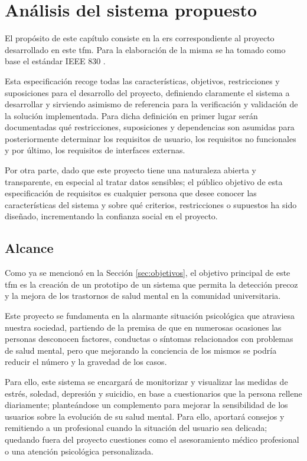 \chapter{Análisis del sistema propuesto}
\label{chapter:analisis}


El propósito de este capítulo consiste en la \gls{ers} correspondiente al proyecto desarrollado en este \gls{tfm}. Para la elaboración de la misma se ha tomado como base el estándar IEEE 830 \cite{noauthor_ieee_1998}.

Esta especificación recoge todas las características, objetivos, restricciones y suposiciones para el desarrollo del proyecto, definiendo claramente el sistema a desarrollar y sirviendo asimismo de referencia para la verificación y validación de la solución implementada. Para dicha definición en primer lugar serán documentadas qué restricciones, suposiciones y dependencias son asumidas para posteriormente determinar los requisitos de usuario, los requisitos no funcionales y por último, los requisitos de interfaces externas.

Por otra parte, dado que este proyecto tiene una naturaleza abierta y transparente, en especial al tratar datos sensibles; el público objetivo de esta especificación de requisitos es cualquier persona que desee conocer las características del sistema y sobre qué criterios, restricciones o supuestos ha sido diseñado, incrementando la confianza social en el proyecto.
        
\section{Alcance}
    \label{req:intro:alcance}
    Como ya se mencionó en la Sección \ref{sec:objetivos}, el objetivo principal de este \gls{tfm} es la creación de un prototipo de un sistema que permita la detección precoz y la mejora de los trastornos de salud mental en la comunidad universitaria. 

    Este proyecto se fundamenta en la alarmante situación psicológica que atraviesa nuestra sociedad, partiendo de la premisa de que en numerosas ocasiones las personas desconocen factores, conductas o síntomas relacionados con problemas de salud mental, pero que mejorando la conciencia de los mismos se podría reducir el número y la gravedad de los casos.

    Para ello, este sistema se encargará de monitorizar y visualizar las medidas de estrés, soledad, depresión y suicidio, en base a cuestionarios que la persona rellene diariamente; planteándose un complemento para mejorar la sensibilidad de los usuarios sobre la evolución de su salud mental. Para ello, aportará consejos y remitiendo a un profesional cuando la situación del usuario sea delicada; quedando fuera del proyecto cuestiones como el asesoramiento médico profesional o una atención psicológica personalizada.

